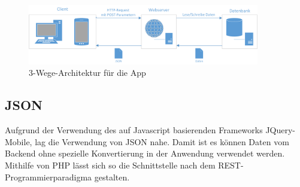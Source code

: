 \documentclass[10pt, conference, compsocconf]{IEEEtran}
\begin{document}
\begin{figure}[t]
	\centering
	\includegraphics[width=0.9\textwidth]{./Bilder_Zeichnungen/Architektur.png}
	\caption{3-Wege-Architektur f\"ur die App}
	\label{fig:Architektur}
\end{figure}

\subsection{JSON}
Aufgrund der Verwendung des auf Javascript basierenden Frameworks JQuery-Mobile, lag die Verwendung von JSON nahe.
Damit ist es können Daten vom Backend ohne spezielle Konvertierung in der Anwendung verwendet werden. 
Mithilfe von PHP l\"asst sich so die Schnittstelle nach dem REST-Programmierparadigma gestalten.
\end{document}
